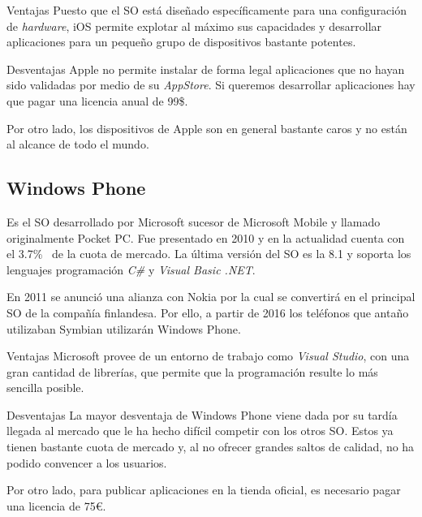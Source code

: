 \begin{definitionlist}
  \item[Ventajas] Puesto que el \acs{SO} está diseñado específicamente para una configuración de
    \emph{hardware}, iOS permite explotar al máximo sus capacidades y desarrollar aplicaciones para
    un pequeño grupo de dispositivos bastante potentes.

  \item[Desventajas] Apple no permite instalar de forma legal aplicaciones que no hayan sido
    validadas por medio de su \emph{AppStore}. Si queremos desarrollar aplicaciones hay que pagar
    una licencia anual de 99\$.

    Por otro lado, los dispositivos de Apple son en general bastante caros y no están al alcance de
    todo el mundo.

\end{definitionlist}

\subsection{Windows Phone}

Es el \acs{SO} desarrollado por Microsoft sucesor de Microsoft Mobile y llamado originalmente Pocket
PC. Fue presentado en 2010 y en la actualidad cuenta con el 3.7\%~\cite{Llamas13} de la cuota de
mercado. La última versión del \acs{SO} es la 8.1 y soporta los lenguajes programación \emph{C\#} y
\emph{Visual Basic .NET}.

En 2011 se anunció una alianza con Nokia por la cual se convertirá en el principal \acs{SO} de la
compañía finlandesa. Por ello, a partir de 2016 los teléfonos que antaño utilizaban Symbian
utilizarán Windows Phone.

\begin{definitionlist}
  \item[Ventajas] Microsoft provee de un entorno de trabajo como \emph{Visual Studio}, con una gran
    cantidad de librerías, que permite que la programación resulte lo más sencilla posible.

  \item[Desventajas] La mayor desventaja de Windows Phone viene dada por su tardía llegada al
    mercado que le ha hecho difícil competir con los otros \acs{SO}. Estos ya tienen bastante cuota
    de mercado y, al no ofrecer grandes saltos de calidad, no ha podido convencer a los usuarios.

    Por otro lado, para publicar aplicaciones en la tienda oficial, es necesario pagar una licencia
    de 75\euro{}.

\end{definitionlist}

